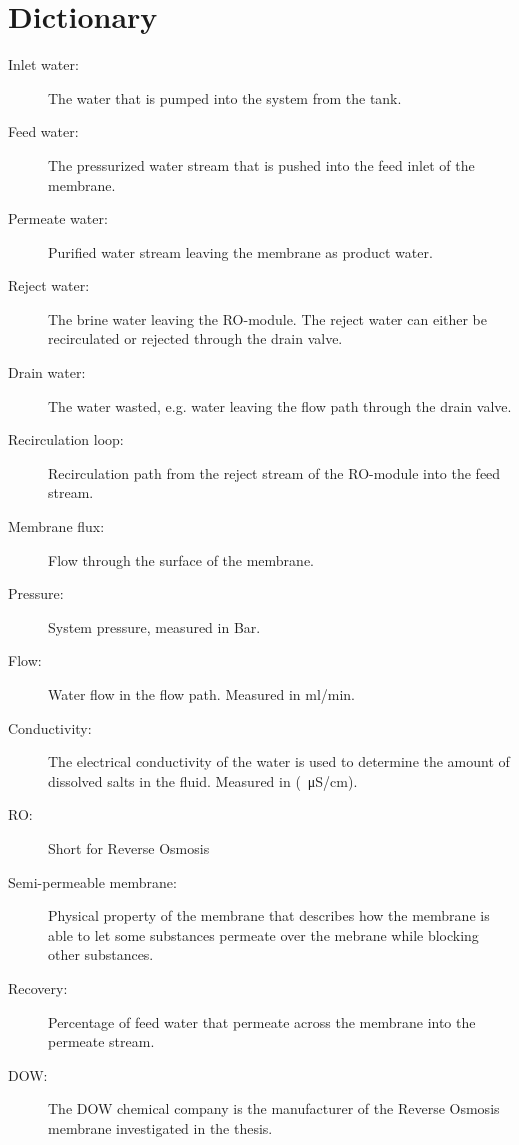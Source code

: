 

\section*{Dictionary}


\begin{description}
\item [Inlet water:] The water that is pumped into the system from the tank.
\item [Feed water:] The pressurized water stream that is pushed into the feed inlet of the membrane.
\item [Permeate water:]  Purified water stream leaving the membrane as product water.
\item [Reject water:] The brine water leaving the RO-module. The reject water can either be recirculated or rejected through the drain valve.
\item [Drain water:] The water wasted, e.g. water leaving the flow path through the drain valve.
\item [Recirculation loop:] Recirculation path from the reject stream of the RO-module into the feed stream.
\item [Membrane flux:] Flow through the surface of the membrane.
\item [Pressure:]  System pressure, measured in Bar.
\item [Flow:] Water flow in the flow path. Measured in ml/min.
\item [Conductivity:] The electrical conductivity of the water is used to determine the amount of dissolved salts in the fluid. Measured in  (\SI{}{\micro\siemens}/cm).
\item [RO:] Short for Reverse Osmosis
\item [Semi-permeable membrane:] Physical property of the membrane that describes how the membrane is able to let some substances permeate over the mebrane while blocking other substances.
\item [Recovery:] Percentage of feed water that permeate across the membrane into the permeate stream.
\item [DOW:] The DOW chemical company is the manufacturer of the Reverse Osmosis membrane investigated in the thesis.

\end{description}



